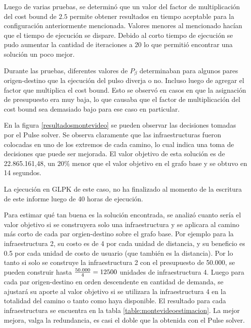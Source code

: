 \documentclass{article}
\begin{document}
  Luego de varias pruebas, se determinó que un valor del factor de multiplicación del cost bound de $2.5$ permite obtener resultados en tiempo aceptable para la configuración anteriormente mencionada. Valores menores al mencionado hacían que el tiempo de ejecución se dispare. Debido al corto tiempo de ejecución se pudo aumentar la cantidad de iteraciones a $20$ lo que permitió encontrar una solución un poco mejor.
  
  Durante las pruebas, diferentes valores de $P_{\beta}$ determinaban para algunos pares origen-destino que la ejecución del pulso diverja o no. Incluso luego de agregar el factor que multiplica el cost bound. Esto se observó en casos en que la asignación de presupuesto era muy baja, lo que causaba que el factor de multiplicación del cost bound sea demasiado bajo para ese caso en particular.
  
  En la figura \ref{resultadosmontevideo} se pueden observar las decisiones tomadas por el Pulse solver. Se observa claramente que las infraestructuras fueron colocadas en uno de los extremos de cada camino, lo cual indica una toma de decisiones que puede ser mejorada. El valor objetivo de esta solución es de 22.865.161,48, un $20\%$ menor que el valor objetivo en el grafo base y se obtuvo en 14 segundos.

  La ejecución en GLPK de este caso, no ha finalizado al momento de la escritura de este informe luego de 40 horas de ejecución.

  Para estimar qué tan buena es la solución encontrada, se analizó cuanto sería el valor objetivo si se construyera solo una infraestructura y se aplicara al camino más corto de cada par orgien-destino sobre el grafo base. Por ejemplo para la infraestructura 2, su costo es de 4 por cada unidad de distancia, y su beneficio es 0.5 por cada unidad de costo de usuario (que también es la distancia). Por lo tanto si solo se construye la infraestructura 2 con el presupuesto de 50.000, se pueden construir hasta ${50.000 \over 4} = 12500$ unidades de infraestructura 4. Luego para cada par origen-destino en orden descendente en cantidad de demanda, se ajustará su aporte al valor objetivo si se utilizara la infraestructura 4 en la totalidad del camino o tanto como haya disponible. El resultado para cada infraestructura se encuentra en la tabla \ref{table:montevideoestimacion}. La mejor mejora, valga la redundancia, es casi el doble que la obtenida con el Pulse solver.
  
\end{document}
